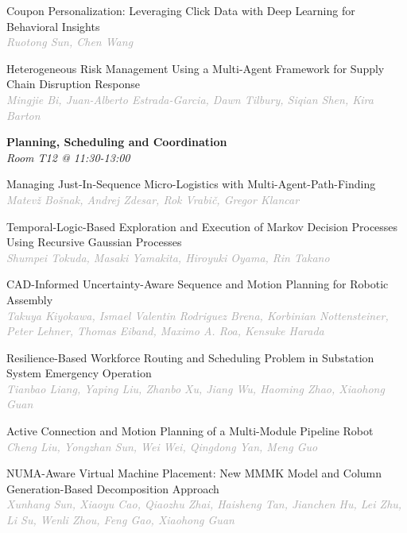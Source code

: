 \begin{multicols*}{2}
\small Coupon Personalization: Leveraging Click Data with Deep Learning for Behavioral Insights\\ 
\footnotesize \textcolor{darkgray}{\textit{Ruotong Sun, Chen  Wang}}

\small Heterogeneous Risk Management Using a Multi-Agent Framework for Supply Chain Disruption Response\\ 
\footnotesize \textcolor{darkgray}{\textit{Mingjie Bi, Juan-Alberto  Estrada-Garcia, Dawn  Tilbury, Siqian  Shen, Kira  Barton}}

\normalsize \textbf{Planning, Scheduling and Coordination}\\
\small \textit{Room T12 @ 11:30-13:00}

\small Managing Just-In-Sequence Micro-Logistics with Multi-Agent-Path-Finding\\ 
\footnotesize \textcolor{darkgray}{\textit{Matevž Bošnak, Andrej  Zdesar, Rok Vrabič, Gregor  Klancar}}

\small Temporal-Logic-Based Exploration and Execution of Markov Decision Processes Using Recursive Gaussian Processes\\ 
\footnotesize \textcolor{darkgray}{\textit{Shumpei Tokuda, Masaki  Yamakita, Hiroyuki  Oyama, Rin  Takano}}

\small CAD-Informed Uncertainty-Aware Sequence and Motion Planning for Robotic Assembly\\ 
\footnotesize \textcolor{darkgray}{\textit{Takuya Kiyokawa, Ismael Valentin  Rodriguez Brena, Korbinian  Nottensteiner, Peter  Lehner, Thomas  Eiband, Maximo A.  Roa, Kensuke  Harada}}

\small Resilience-Based Workforce Routing and Scheduling Problem in Substation System Emergency Operation\\ 
\footnotesize \textcolor{darkgray}{\textit{Tianbao Liang, Yaping  Liu, Zhanbo  Xu, Jiang  Wu, Haoming  Zhao, Xiaohong  Guan}}

\small Active Connection and Motion Planning of a Multi-Module Pipeline Robot\\ 
\footnotesize \textcolor{darkgray}{\textit{Cheng Liu, Yongzhan  Sun, Wei  Wei, Qingdong  Yan, Meng  Guo}}

\small NUMA-Aware Virtual Machine Placement: New MMMK Model and Column Generation-Based Decomposition Approach\\ 
\footnotesize \textcolor{darkgray}{\textit{Xunhang Sun, Xiaoyu  Cao, Qiaozhu  Zhai, Haisheng  Tan, Jianchen  Hu, Lei  Zhu, Li  Su, Wenli  Zhou, Feng  Gao, Xiaohong  Guan}}


\end{multicols*}
